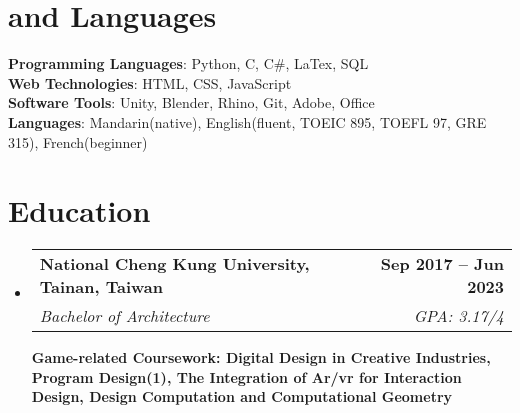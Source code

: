 \documentclass[letterpaper,11pt]{article}
\makeatletter
\newcommand{\resumeSubheading}[4]{
    \vspace{-2pt}\item
    \begin{tabular*}{1.0\textwidth}[t]{l@{\extracolsep{\fill}}r}
    \textbf{#1} & \textbf{\small #2} \\
    \textit{\small#3} & \textit{\small #4} \\
    \end{tabular*}\vspace{-7pt}
}
\newcommand{\resumeSubHeadingListStart}{\begin{itemize}[leftmargin=0.0in, label={}]}
\newcommand{\resumeSubHeadingListEnd}{\end{itemize}}
\makeatother
\begin{document}
\section{ and Languages}
\textbf{Programming Languages}{: Python, C, C\#, LaTex, SQL} \\
\textbf{Web Technologies}{: HTML, CSS, JavaScript} \\
\textbf{Software Tools}{: Unity, Blender, Rhino, Git, Adobe, Office}\\
\textbf{Languages}{: Mandarin(native), English(fluent, TOEIC 895, TOEFL 97, GRE 315), French(beginner)}

\section{Education}
\resumeSubHeadingListStart
\resumeSubheading
{National Cheng Kung University, Tainan, Taiwan}{Sep 2017 -- Jun 2023}
{Bachelor of Architecture}{GPA: 3.17/4}

\small{\textbf{Game-related Coursework: Digital Design in Creative Industries, Program Design(1), The Integration of Ar/vr for Interaction Design, Design Computation and Computational Geometry}}
\resumeSubHeadingListEnd


\end{document}
